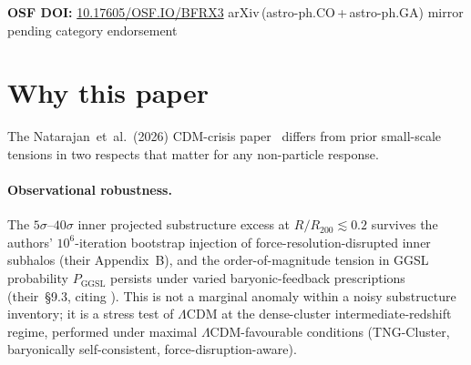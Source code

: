 \documentclass{pantarhei-researchnote}
\newcommand{\Rtwohun}{R_{200}}
\newcommand{\kpc}{\mathrm{kpc}}
\newcommand{\rtran}{r_{\mathrm{trans}}}
\newcommand{\Pggsl}{P_{\mathrm{GGSL}}}
\newcommand{\readout}{\textsc{[readout]}}
\newcommand{\falsifierID}[1]{\textsc{N16.#1}}
\begin{document}
\begin{abstract}
with the empirical break at $r \sim 10\,\kpc$ across all three MACS clusters.
We pre-register one headline falsifier
(\falsifierID{3}: host-mass independence of $\rtran$ at fixed subhalo
mass function, testable with Euclid + Rubin LSST by $\sim 2029$) and one
structurally honest tension reframed as falsifier: the $\tau$-saturation
family predicts \emph{flatter}, not steeper, inner density slopes
(V.P16~\readout); the GGSL probability must therefore be matched by
member-density (this work, R1), not density-slope, with the discriminating
observation deferred to the future GGSL+kinematics inner-mass-content
test. Three derivational gaps are flagged honestly for future Book V
scaffolding: the precise $\gamma$ value, the SHMF amplitude, and the
$5\sigma$--$40\sigma$ inner-excess amplitude.
\end{abstract}


\maketitle

\begin{center}\small\noindent
\textbf{OSF DOI:}\enspace
\href{https://doi.org/10.17605/OSF.IO/BFRX3}{10.17605/OSF.IO/BFRX3}
\enspace\textbar\enspace
arXiv\,(astro-ph.CO\,+\,astro-ph.GA) mirror pending category endorsement
\end{center}
\vspace{0.5em}


\section{Why this paper}\label{sec:why}

The Natarajan~et~al.\ (2026) CDM-crisis paper~\cite{Natarajan2026} differs
from prior small-scale tensions in two respects that matter for any
non-particle response.

\paragraph{Observational robustness.} The $5\sigma$--$40\sigma$ inner
projected substructure excess at $R/\Rtwohun \lesssim 0.2$ survives the
authors' $10^6$-iteration bootstrap injection of force-resolution-disrupted
inner subhalos (their Appendix~B), and the order-of-magnitude tension in
GGSL probability $\Pggsl$ persists under varied baryonic-feedback
prescriptions (their~\S{}9.3, citing
\cite{Meneghetti2020,Meneghetti2023,Ragagnin2022,Heinze2024}).
This is not a marginal anomaly within a noisy substructure inventory; it is
a stress test of $\Lambda$CDM at the dense-cluster intermediate-redshift
regime, performed under maximal $\Lambda$CDM-favourable conditions
(TNG-Cluster, baryonically self-consistent, force-disruption-aware).
\end{document}
